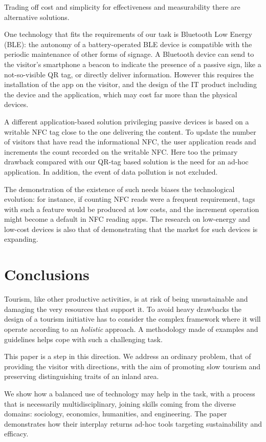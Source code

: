 \documentclass[sustainability,article,submit,pdftex,moreauthors]{Definitions/mdpi}
\begin{document}
Trading off cost and simplicity for effectiveness and measurability there are alternative solutions.

One technology that fits the requirements of our task is Bluetooth Low Energy (BLE): the autonomy of a battery-operated BLE device is compatible with the periodic maintenance of other forms of signage. A Bluetooth device can send to the visitor's smartphone a beacon to indicate the presence of a passive sign, like a not-so-visible QR tag, or directly deliver information. However this requires the installation of the app on the visitor, and the design of the IT product including the device and the application, which may cost far more than the physical devices. 

A different application-based solution privileging passive devices is based on a writable NFC tag close to the one delivering the content. To update the number of visitors that have read the informational NFC, the user application reads and increments the count recorded on the writable NFC. Here too the primary drawback compared with our QR-tag based solution is the need for an ad-hoc application. In addition, the event of data pollution is not excluded.

The demonstration of the existence of such needs biases the technological evolution: for instance, if counting NFC reads were a frequent requirement, tags with such a feature would be produced at low costs, and the increment operation might become a default in NFC reading apps. The research on low-energy and low-cost devices is also that of demonstrating that the market for such devices is expanding.

\section{Conclusions}

Tourism, like other productive activities, is at risk of being unsustainable and damaging the very resources that support it. To avoid heavy drawbacks the design of a tourism initiative has to consider the complex framework where it will operate according to an \emph{holistic} approach. A methodology made of examples and guidelines helps cope with such a challenging task.

This paper is a step in this direction. We address an ordinary problem, that of providing the visitor with directions, with the aim of promoting slow tourism and preserving distinguishing traits of an inland area.

We show how a balanced use of technology may help in the task, with a process that is necessarily multidisciplinary, joining skills coming from the diverse domains: sociology, economics, humanities, and engineering. The paper demonstrates how their interplay returns ad-hoc tools targeting sustainability and efficacy.
\end{document}
